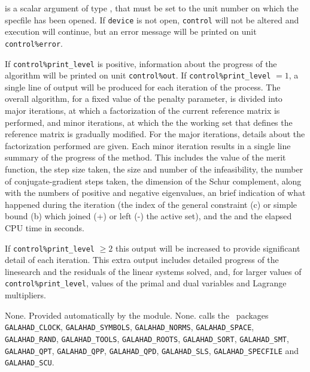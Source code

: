 \documentclass{galahad}
\newcommand{\packagename}{QPA}
\begin{document}
\begin{description}

 is a scalar \intentin argument of type \integer,
that must be set to the unit number on which the specfile
has been opened. If {\tt device} is not open, {\tt control} will
not be altered and execution will continue, but an error message
will be printed on unit {\tt control\%error}.

\end{description}


\galinfo
If {\tt control\%print\_level} is positive, information about the progress 
of the algorithm will be printed on unit {\tt control\-\%out}.
If {\tt control\%print\_level} $= 1$, a single line of output will be produced 
for each iteration of the process. 
The overall algorithm, for a fixed value of the penalty parameter, 
is divided into major iterations, at which 
a factorization of the current reference matrix is performed, and
minor iterations, at which the the working set that defines the
reference matrix is gradually modified.
For the major iterations, details about the factorization performed are given.
Each minor iteration results in a single line summary of the
progress of the method. This includes the value of the merit function,
the step size taken, the size and number of the infeasibility, the
number of conjugate-gradient steps taken, the dimension of the
Schur complement, along with the numbers of positive and negative eigenvalues,
an brief indication of what happened during the iteration (the index of the
general constraint (c) or simple bound (b) which joined (+) or left (-) 
the active set), and the 
and the elapsed CPU time in seconds. 

If {\tt control\%print\_level} $\geq 2$ this 
output will be increased to provide significant detail of each iteration. 
This extra output includes detailed progress of the linesearch and the
residuals of the linear systems solved, and,
for larger values of {\tt control\%print\_level}, values of the primal and dual
variables and Lagrange multipliers. 


\galgeneral

\galcommon None.
\galworkspace Provided automatically by the module.
\galroutines None. 
\galmodules {\tt \packagename\_solve} calls the \galahad\ packages
\sloppy
{\tt GALAHAD\_\-CLOCK},
{\tt GALAHAD\_SY\-M\-BOLS}, 
{\tt GALAHAD\_NORMS}, 
{\tt GALAHAD\_SPACE}, 
{\tt GALAHAD\_RA\-ND}, 
{\tt GALAHAD\_TOOLS}, 
{\tt GALAHAD\_ROOTS}, 
{\tt GALAHAD\_SORT},
{\tt GALAHAD\_SMT}, 
{\tt GALAHAD\_QPT},
{\tt GALAHAD\_QPP},
{\tt GALAHAD\_QPD},
{\tt GALAHAD\_SLS}, 
{\tt GALAHAD\_SPECFILE}
and
{\tt GALAHAD\_SCU}.
\end{document}
